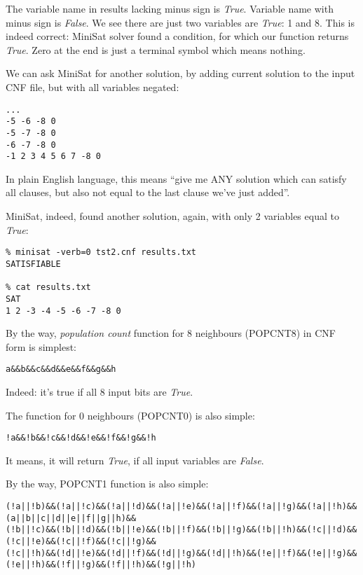 The variable name in results lacking minus sign is \textit{True}.
Variable name with minus sign is \textit{False}.
We see there are just two variables are \textit{True}: 1 and 8.
This is indeed correct: MiniSat solver found a condition, for which our function returns \textit{True}.
Zero at the end is just a terminal symbol which means nothing.

We can ask MiniSat for another solution, by adding current solution to the input CNF file, but with all variables negated:

\begin{lstlisting}
...
-5 -6 -8 0
-5 -7 -8 0
-6 -7 -8 0
-1 2 3 4 5 6 7 -8 0
\end{lstlisting}

In plain English language, this means ``give me ANY solution which can satisfy all clauses, but also not equal to the last clause we've just added''.

MiniSat, indeed, found another solution, again, with only 2 variables equal to \textit{True}:

\begin{lstlisting}
% minisat -verb=0 tst2.cnf results.txt
SATISFIABLE

% cat results.txt
SAT
1 2 -3 -4 -5 -6 -7 -8 0
\end{lstlisting}

By the way, \textit{population count} function for 8 neighbours (POPCNT8) in CNF form is simplest:

\begin{lstlisting}
a&&b&&c&&d&&e&&f&&g&&h
\end{lstlisting}

Indeed: it's true if all 8 input bits are \textit{True}.

The function for 0 neighbours (POPCNT0) is also simple:

\begin{lstlisting}
!a&&!b&&!c&&!d&&!e&&!f&&!g&&!h
\end{lstlisting}

It means, it will return \textit{True}, if all input variables are \textit{False}.

By the way, POPCNT1 function is also simple:

\begin{lstlisting}
(!a||!b)&&(!a||!c)&&(!a||!d)&&(!a||!e)&&(!a||!f)&&(!a||!g)&&(!a||!h)&&(a||b||c||d||e||f||g||h)&&
(!b||!c)&&(!b||!d)&&(!b||!e)&&(!b||!f)&&(!b||!g)&&(!b||!h)&&(!c||!d)&&(!c||!e)&&(!c||!f)&&(!c||!g)&&
(!c||!h)&&(!d||!e)&&(!d||!f)&&(!d||!g)&&(!d||!h)&&(!e||!f)&&(!e||!g)&&(!e||!h)&&(!f||!g)&&(!f||!h)&&(!g||!h)
\end{lstlisting}

